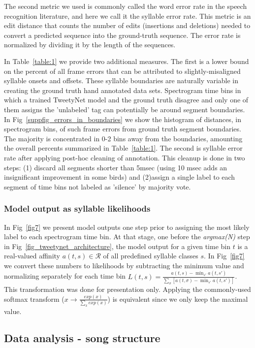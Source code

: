 \documentclass[10pt,letterpaper]{article}
\begin{document}
The second metric we used is commonly called the word error rate in the speech recognition literature, 
and here we call it the syllable error rate. This metric is an edit distance that counts the number of edits (insertions and deletions) needed to convert a predicted sequence into the ground-truth sequence. The error rate is normalized by dividing it by the length of the sequences.

In Table~\ref{table:1} we provide two additional measures. The first is a lower bound on the percent of all frame errors that can be attributed to slightly-misaligned syllable onsets and offsets. 
These syllable boundaries are naturally variable in creating the ground truth hand annotated data sets. Spectrogram time bins in which a trained TweetyNet model and the ground truth disagree and only one of them assigns the 'unlabeled' tag can potentially be around segment boundaries. In Fig~\ref{suppfig_errors_in_boundaries} we show the histogram of distances, in spectrogram bins, of such frame errors from ground truth segment boundaries. The majority is concentrated in 0-2 bins away from the boundaries, amounting the overall percents summarized in Table~\ref{table:1}. The second is syllable error rate after applying post-hoc cleaning of annotation. This cleanup is done in two steps: (1) discard all segments shorter than 5msec (using 10 msec adds an insignificant improvement in some birds) and (2)assign a single label to each segment of time bins not labeled as 'silence' by majority vote.

\subsubsection*{Model output as syllable likelihoods}
In Fig~\ref{fig7} we present model outputs one step prior to assigning the most likely label to each spectrogram time bin. At that stage, one before the \textit{argmax(N)} step in Fig~\ref{fig_tweetynet_architecture}, the model output for a given time bin $t$ is a real-valued affinity $a(t,s)\in\mathcal{R}$ of all predefined syllable classes $s$. In Fig~\ref{fig7} we convert these numbers to likelihoods by subtracting the minimum value and normalizing separately for each time bin $L(t,s)=\frac{a(t,s)-\min_{s'}a(t,s')}{\sum_{\sigma}[a(t,\sigma)-\min_{s'}a(t,s')]}$. This transformation was done for presentation only. Applying the commonly-used softmax transform ($x\rightarrow\frac{exp(x)}{\sum_xexp(x)}$) is equivalent since we only keep the maximal value.

\subsection*{Data analysis - song structure} 
\end{document}
